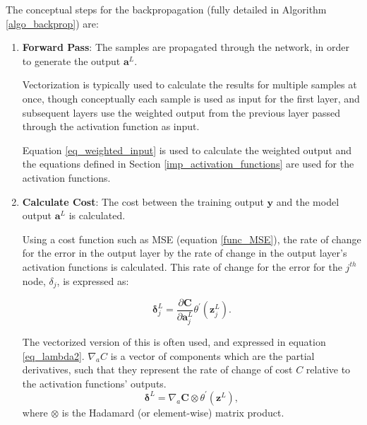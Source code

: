 \documentclass[a4paper,11pt,oneside]{article}
\theoremstyle{plain}
\theoremstyle{definition}
\begin{document}
	The conceptual steps for the backpropagation (fully detailed in Algorithm \ref{algo_backprop}) are: \newline
	\begin{enumerate}
		\item \textbf{Forward Pass}: The samples are propagated through the network, in order to generate the output $\mathbf{a}^L$. \newline 
		
		Vectorization is typically used to calculate the results for multiple samples at once, though conceptually each sample is used as input for the first layer, and subsequent layers use the weighted output from the previous layer passed through the activation function as input.\newline 
		
		Equation \ref{eq_weighted_input} is used to calculate the weighted output and the equations defined in Section \ref{imp_activation_functions} are used for the activation functions.
		\newline
		
		\item \textbf{Calculate Cost}: The cost between the training output $\mathbf{y}$ and the model output $\mathbf{a}^L$ is calculated. \newline
		
		Using a cost function such as MSE (equation \eqref{func_MSE}), the rate of change for the error in the output layer by the rate of change in the output layer's activation functions is calculated. This rate of change for the error for the $j^{th}$ node, $\delta_j$, is expressed as:	
		
		\begin{equation}\label{eq_lambda1}
		\mathbf{\delta}_{j}^{L}=\frac{\partial \mathbf{C}}{\partial \mathbf{a}_{j}^{L}} \theta^{\prime}\left(\mathbf{z}_{j}^{L}\right) .
		\end{equation}
		
		The vectorized version of this is often used, and expressed in equation \eqref{eq_lambda2}. $\nabla_a C$ is a vector of components which are the partial derivatives, such that they represent the rate of change of cost $C$ relative to the activation functions' outputs.
		\begin{equation}\label{eq_lambda2}
		\mathbf{\delta}^{L}=\nabla_a \mathbf{C} \otimes \theta^{\prime}(\mathbf{z}^L), 
		\end{equation}
		where $\otimes$ is the Hadamard (or element-wise) matrix product.\newline
		

\end{enumerate}
\end{document}
